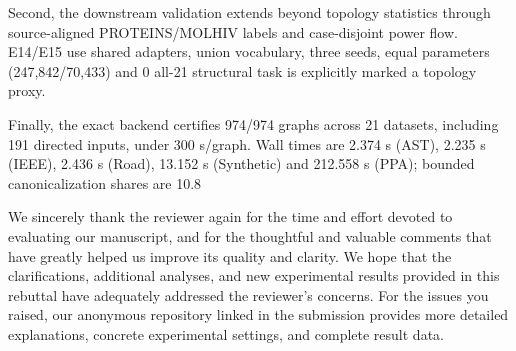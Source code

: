 Second, the downstream validation extends beyond topology statistics through
source-aligned PROTEINS/MOLHIV labels and case-disjoint power flow. E14/E15 use
shared adapters, union vocabulary, three seeds, equal parameters (247,842/70,433)
and 0%
all-21 structural task is explicitly marked a topology proxy.

Finally, the exact backend certifies 974/974 graphs across 21 datasets,
including 191 directed inputs, under 300 s/graph. Wall times are 2.374 s (AST),
2.235 s (IEEE), 2.436 s (Road), 13.152 s (Synthetic) and 212.558 s (PPA);
bounded canonicalization shares are 10.8%

We sincerely thank the reviewer again for the time and effort devoted to
evaluating our manuscript, and for the thoughtful and valuable comments that
have greatly helped us improve its quality and clarity. We hope that the
clarifications, additional analyses, and new experimental results provided in
this rebuttal have adequately addressed the reviewer's concerns. For the
issues you raised, our anonymous repository linked in the submission provides
more detailed explanations, concrete experimental settings, and complete
result data.
